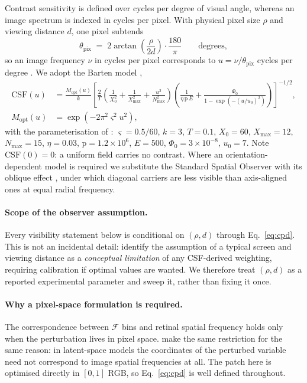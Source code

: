 Contrast sensitivity is defined over cycles per degree of visual angle,
whereas an image spectrum is indexed in cycles per pixel. With physical
pixel size $\rho$ and viewing distance $d$, one pixel subtends
\begin{equation}
  \theta_{\mathrm{pix}} \;=\; 2\arctan\!\left(\frac{\rho}{2d}\right)\cdot\frac{180}{\pi}
  \qquad\text{degrees},
  \label{eq:cpd}
\end{equation}
so an image frequency $\nu$ in cycles per pixel corresponds to
$u=\nu/\theta_{\mathrm{pix}}$ cycles per degree
\citep[App.~D]{galinska2026csflow}. We adopt the Barten model
\citep{barten2003},
\begin{align}
  \mathrm{CSF}(u) &= \frac{M_{\mathrm{opt}}(u)}{k}
  \left[\frac{2}{T}\!\left(\frac{1}{X_0^{2}}+\frac{1}{X_{\max}^{2}}
  +\frac{u^{2}}{N_{\max}^{2}}\right)
  \!\left(\frac{1}{\eta\,\mathrm{p}\,E}
  +\frac{\Phi_0}{1-\exp\!\left(-(u/u_0)^{2}\right)}\right)\right]^{-1/2},
  \label{eq:barten}\\
  M_{\mathrm{opt}}(u) &= \exp\!\left(-2\pi^{2}\varsigma^{2}u^{2}\right),
\end{align}
with the parameterisation of \citet[App.~A]{galinska2026csflow}:
$\varsigma=0.5/60$, $k=3$, $T=0.1$, $X_0=60$, $X_{\max}=12$,
$N_{\max}=15$, $\eta=0.03$, $\mathrm{p}=1.2\times10^{6}$, $E=500$,
$\Phi_0=3\times10^{-8}$, $u_0=7$. Note $\mathrm{CSF}(0)=0$: a uniform
field carries no contrast. Where an orientation-dependent model is
required we substitute the Standard Spatial Observer with its oblique
effect \citep{watson2005sso}, under which diagonal carriers are less
visible than axis-aligned ones at equal radial frequency.

\paragraph{Scope of the observer assumption.}
Every visibility statement below is conditional on $(\rho,d)$ through
Eq.~\eqref{eq:cpd}. This is not an incidental detail:
\citet[Sec.~6]{galinska2026csflow} identify the assumption of a typical
screen and viewing distance as a \emph{conceptual limitation} of any
CSF-derived weighting, requiring calibration if optimal values are
wanted. We therefore treat $(\rho,d)$ as a reported experimental
parameter and sweep it, rather than fixing it once.

\paragraph{Why a pixel-space formulation is required.}
The correspondence between $\mathcal{F}$ bins and retinal spatial
frequency holds only when the perturbation lives in pixel space.
\citet[Sec.~5.1]{galinska2026csflow} make the same restriction for the
same reason: in latent-space models the coordinates of the perturbed
variable need not correspond to image spatial frequencies at all. The
patch here is optimised directly in $[0,1]$ RGB, so
Eq.~\eqref{eq:cpd} is well defined throughout.

